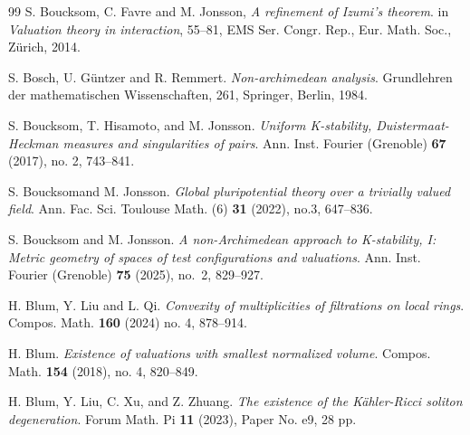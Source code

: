 \documentclass[11pt, leqno]{amsart}%
\theoremstyle{plain}
\theoremstyle{definition}
\theoremstyle{remark}
\numberwithin{equation}{section}
\begin{document}
\begin{thebibliography}{99}
     S. Boucksom, C. Favre and M. Jonsson, \emph{A refinement of Izumi's theorem}. in \emph{Valuation theory in interaction}, 55--81, EMS Ser. Congr. Rep., Eur. Math. Soc., Z\"urich, 2014.
	
	
     S. Bosch, U. Güntzer and R. Remmert. \emph{Non-archimedean analysis}. 
    Grundlehren der mathematischen Wissenschaften, 261, Springer, Berlin, 1984.
	
     S. Boucksom, T. Hisamoto, and M. Jonsson. \emph{Uniform K-stability, Duistermaat-Heckman measures and singularities of pairs}.
    Ann. Inst. Fourier (Grenoble)  \textbf{67}  (2017),  no. 2, 743--841.
	
     S. Boucksomand M. Jonsson. \emph{Global pluripotential theory over a trivially valued field}. 
    Ann. Fac. Sci. Toulouse Math. (6) \textbf{31} (2022), no.3, 647–836.
    
     S. Boucksom and M. Jonsson. \emph{A non-Archimedean approach to K-stability, I: Metric geometry of spaces of test configurations and valuations}. 
    Ann. Inst. Fourier (Grenoble) {\bf 75} (2025), no.~2, 829--927.
	
	
	
     H. Blum, Y. Liu and L. Qi. \emph{Convexity of multiplicities of filtrations on local rings}. 
    Compos. Math. \textbf{160} (2024) no. 4, 878--914. 
	
     H. Blum. \emph{Existence of valuations with smallest normalized volume}. 
    Compos. Math. \textbf{154} (2018), no. 4, 820--849.	
	
     H. Blum, Y. Liu, C. Xu, and Z. Zhuang. \emph{The existence of the K\"ahler-Ricci soliton degeneration}.
    Forum Math. Pi \textbf{11} (2023), Paper No. e9, 28 pp.
	
	
	
	

\end{thebibliography}
\end{document}

